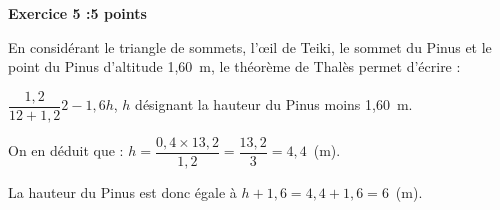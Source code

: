 \textbf{Exercice 5 :\hfill 5 points}

\medskip

%
%
%
% 
%
%
En considérant le triangle de sommets, l'œil de Teiki, le sommet du Pinus et le point du Pinus d'altitude 1,60~m, le théorème de Thalès permet d'écrire :

$\dfrac{1,2}{12+1,2}{2 - 1,6}{h}$, $h$ désignant la hauteur du Pinus moins 1,60~m.

On en déduit que : $h = \dfrac{0,4 \times 13,2}{1,2} = \dfrac{13,2}{3} = 4,4$~(m).

La hauteur du Pinus est donc égale à $h + 1,6 = 4,4 + 1,6 = 6$~(m).

\bigskip

